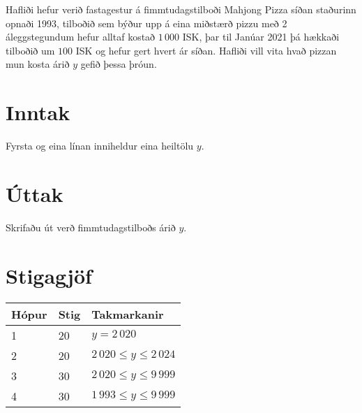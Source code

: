 
Hafliði hefur verið fastagestur á fimmtudagstilboði Mahjong Pizza síðan staðurinn opnaði 1993, tilboðið sem býður
upp á eina miðstærð pizzu með 2 áleggstegundum hefur alltaf kostað $1\,000$ ISK, þar til Janúar 2021 þá hækkaði
tilboðið um $100$ ISK og hefur gert hvert ár síðan. Hafliði vill vita hvað pizzan mun kosta árið $y$ gefið þessa þróun.


\section*{Inntak}
Fyrsta og eina línan inniheldur eina heiltölu $y$.

\section*{Úttak}
Skrifaðu út verð fimmtudagstilboðs árið $y$.

\section*{Stigagjöf}
\begin{tabular}{|l|l|l|}
\hline
Hópur & Stig & Takmarkanir \\ \hline
1     & 20   & $y = 2\,020$ \\ \hline
2     & 20   & $2\,020 \leq y \leq 2\,024$ \\ \hline
3     & 30   & $2\,020 \leq y \leq 9\,999$ \\ \hline
4     & 30   & $1\,993 \leq y \leq 9\,999$ \\ \hline
\end{tabular}
